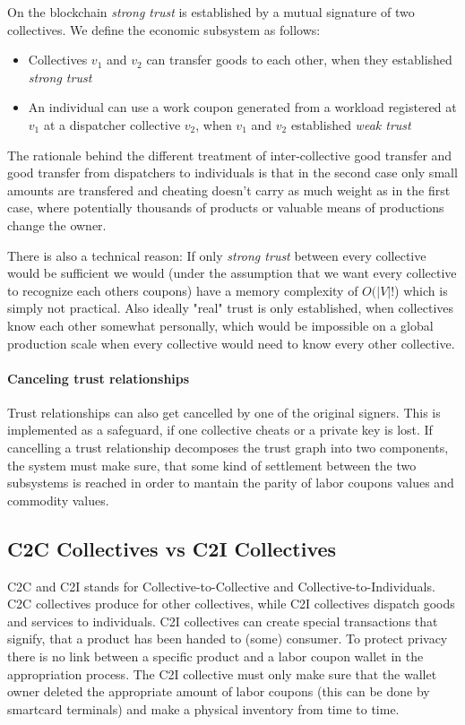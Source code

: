 \documentclass[11pt]{article}
\begin{document}
On the blockchain \emph{strong trust} is established by a mutual signature of two collectives. We define the economic subsystem as follows:

\begin{itemize}
\item Collectives $v_1$ and $v_2$ can transfer goods to each other, when they established \emph{strong trust}
\item An individual can use a work coupon generated from a workload registered at $v_1$ at a dispatcher collective $v_2$, when $v_1$ and $v_2$ established \emph{weak trust}
\end{itemize}

The rationale behind the different treatment of inter-collective good transfer and good transfer from dispatchers to individuals is that in the second case only small amounts are transfered and cheating doesn't carry as much weight as in the first case, where potentially thousands of products or valuable means of productions change the owner.

There is also a technical reason: If only \emph{strong trust} between every collective would be sufficient we would (under the assumption that we want every collective to recognize each others coupons) have a memory complexity of $O(|V|!$) which is simply not practical. Also ideally "real" trust is only established, when collectives know each other somewhat personally, which would be impossible on a global production scale when every collective would need to know every other collective.

\paragraph{Canceling trust relationships}

Trust relationships can also get cancelled by one of the original signers. This is implemented as a safeguard, if one collective cheats or a private key is lost. If cancelling a trust relationship decomposes the trust graph into two components, the system must make sure, that some kind of settlement between the two subsystems is reached in order to mantain the parity of labor coupons values and commodity values. 

\subsection{C2C Collectives vs C2I Collectives}

C2C and C2I stands for Collective-to-Collective and Collective-to-Individuals. C2C collectives produce for other collectives, while C2I collectives dispatch goods and services to individuals. C2I collectives can create special transactions that signify, that a product has been handed to (some) consumer. To protect privacy there is no link between a specific product and a labor coupon wallet in the appropriation process. The C2I collective must only make sure that the wallet owner deleted the appropriate amount of labor coupons (this can be done by smartcard terminals) and make a physical inventory from time to time.
\end{document}

